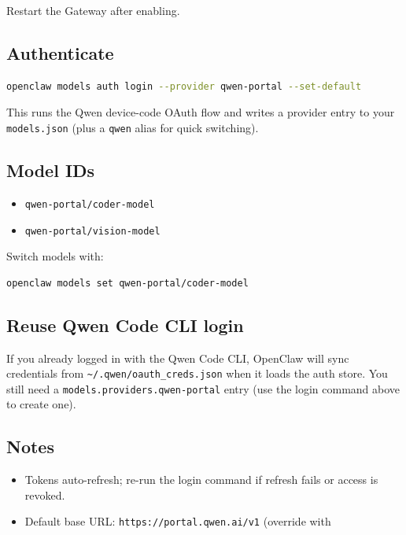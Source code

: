Restart the Gateway after enabling.

\subsection{Authenticate}


\begin{lstlisting}[language=bash]
openclaw models auth login --provider qwen-portal --set-default
\end{lstlisting}


This runs the Qwen device-code OAuth flow and writes a provider entry to your
\texttt{models.json} (plus a \texttt{qwen} alias for quick switching).

\subsection{Model IDs}


\begin{itemize}
  \item \texttt{qwen-portal/coder-model}
  \item \texttt{qwen-portal/vision-model}
\end{itemize}


Switch models with:

\begin{lstlisting}[language=bash]
openclaw models set qwen-portal/coder-model
\end{lstlisting}


\subsection{Reuse Qwen Code CLI login}


If you already logged in with the Qwen Code CLI, OpenClaw will sync credentials
from \texttt{\textasciitilde{}/.qwen/oauth\_creds.json} when it loads the auth store. You still need a
\texttt{models.providers.qwen-portal} entry (use the login command above to create one).

\subsection{Notes}


\begin{itemize}
  \item Tokens auto-refresh; re-run the login command if refresh fails or access is revoked.
  \item Default base URL: \texttt{https://portal.qwen.ai/v1} (override with
\end{itemize}

